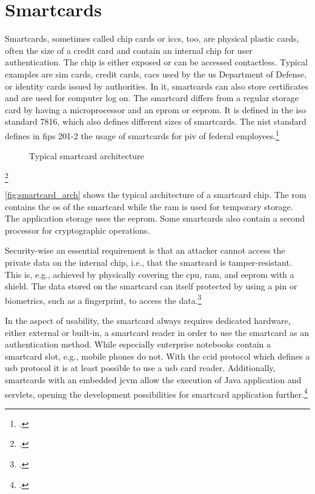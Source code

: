 \section{Smartcards}

Smartcards, sometimes called chip cards or \glspl{icc}, too, are physical plastic cards, often the size of a credit card and contain an internal chip for user authentication. The chip is either exposed or can be accessed contactless. Typical examples are \gls{sim} cards, credit cards, \glspl{cac} used by the \gls{us} Department of Defense, or identity cards issued by authorities. In \gls{it}, smartcards can also store certificates and are used for computer log on. The smartcard differs from a regular storage card by having a microprocessor and an \gls{eprom} or \gls{eeprom}. It is defined in the \gls{iso} standard 7816, which also defines different sizes of smartcards. The \gls{nist} standard defines in \gls{fips} 201-2 the usage of smartcards for \gls{piv} of federal employees.\footcites[See][525--527]{eckert-it-sec-9}[See][]{iso7816}[See][6--9]{Mayes2017}[See][]{FIPS201-2}

\begin{figure}[hbt]
	\centering
	
	\caption[Typical smartcard architecture]{Typical smartcard architecture\footnotemark}
	\label{fig:smartcard_arch}
\end{figure}
\footcitetexts[Source: diagram by author, based on][33]{electronic_certification_mobile_devices}[][228]{Tunstall2017}

\autoref{fig:smartcard_arch} shows the typical architecture of a smartcard chip. The \gls{rom} contains the \gls{os} of the smartcard while the \gls{ram} is used for temporary storage. The application storage uses the \gls{eeprom}. Some smartcards also contain a second processor for cryptographic operations.

Security-wise an essential requirement is that an attacker cannot access the private data on the internal chip, i.e., that the smartcard is tamper-resistant. This is, e.g., achieved by physically covering the \gls{cpu}, \gls{ram}, and \gls{eeprom} with a shield. The data stored on the smartcard can itself protected by using a \gls{pin} or biometrics, such as a fingerprint, to access the data.\footcites[See][34]{265831}[See][228]{Tunstall2017}

In the aspect of usability, the smartcard always requires dedicated hardware, either external or built-in, a smartcard reader in order to use the smartcard as an authentication method. While especially enterprise notebooks contain a smartcard slot, e.g., mobile phones do not. With the \gls{ccid} protocol which defines a \gls{usb} protocol it is at least possible to use a \gls{usb} card reader. Additionally, smartcards with an embedded \gls{jcvm} allow the execution of Java application and servlets, opening the development possibilities for smartcard application further.\footcites[See][65]{Markantonakis2017}[See][539]{eckert-it-sec-9}